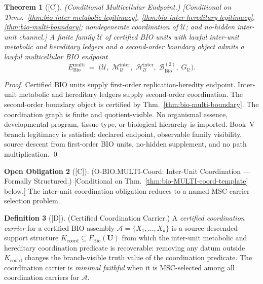 \documentclass[12pt,oneside]{amsbook}
\theoremstyle{plain}
\newtheorem{theorem}{Theorem}[section]
\theoremstyle{definition}
\newtheorem{definition}[theorem]{Definition}
\newtheorem{obligation}[theorem]{Open Obligation}
\theoremstyle{remark}
\newcommand{\status}[1]{\textup{[#1]}}
\begin{document}
\begin{theorem}[\status{C}]\label{thm:bio-multi-endpoint}
\textup{(Conditional Multicellular Endpoint.)}
\textup{[Conditional on Thms.~\ref{thm:bio-inter-metabolic-legitimacy},
\ref{thm:bio-inter-hereditary-legitimacy}, \ref{thm:bio-multi-boundary};
nondegenerate coordination of $\mathcal{U}$; and no-hidden inter-unit
channel.]}
A finite family $\mathcal{U}$ of certified BIO units with lawful
inter-unit metabolic and hereditary ledgers and a second-order boundary
object admits a lawful multicellular BIO endpoint
\[
 E_{\mathrm{Bio}}^{\mathrm{multi}} \;=\;
 \bigl(\mathcal{U},\;
 \mathcal{M}_{\mathcal{U}}^{\mathrm{inter}},\;
 \mathcal{H}_{\mathcal{U}}^{\mathrm{inter}},\;
 \mathcal{B}_{\mathrm{Bio}}^{(2)},\;
 G_{\mathcal{U}}\bigr).
\]
\end{theorem}

\begin{proof}
Certified BIO units supply first-order replication-heredity endpoint.
Inter-unit metabolic and hereditary ledgers supply second-order
coordination. The second-order boundary object is certified by
Thm.~\ref{thm:bio-multi-boundary}. The coordination graph is
finite and quotient-visible. No organismal essence, developmental
program, tissue type, or biological hierarchy is imported.
Book~V branch legitimacy is satisfied: declared endpoint, observable
family visibility, source descent from first-order BIO units,
no-hidden supplement, and no path multiplication.
\qed
\end{proof}

\begin{obligation}[\status{C}]\label{ob:bio-MULTI-coordination}
\textup{(O-BIO.MULTI-Coord: Inter-Unit Coordination ---
Formally Structured.)}
\textup{[Conditional on Thm.~\ref{thm:bio-MULTI-coord-template} below.]}
The inter-unit coordination obligation reduces to a named
MSC-carrier selection problem.
\end{obligation}

\begin{definition}[\status{D}]\label{def:bio-coordination-carrier}
\textup{(Certified Coordination Carrier.)}
A \emph{certified coordination carrier} for a certified BIO
assembly $\mathcal{A} = \{X_1, \ldots, X_k\}$ is a
source-descended support structure
$K_{\mathrm{coord}} \subseteq F_{\mathrm{Bio}}(\mathbf{U})$
from which the inter-unit metabolic and hereditary coordination
predicate is recoverable: removing any datum outside
$K_{\mathrm{coord}}$ changes the branch-visible truth value of
the coordination predicate.  The coordination carrier is
\emph{minimal faithful} when it is MSC-selected among all
coordination carriers for $\mathcal{A}$.
\end{definition}
\end{document}
